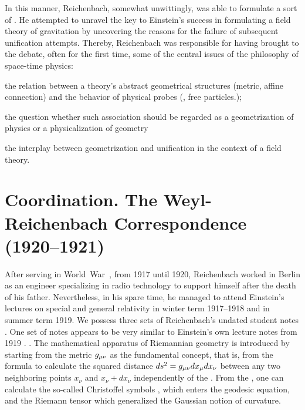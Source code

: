 \documentclass[draft]{article}
\newcommand{\xdx}{\ensuremath{x_\nu} and \ensuremath{x_\nu + dx_\nu}\xspace}
\begin{document}

In this manner, Reichenbach, somewhat unwittingly, was able to formulate a sort of  \citep{Lehmkuhl2017}. He attempted to unravel the key to Einstein's success in formulating a field theory of gravitation by uncovering the reasons for the failure of subsequent unification attempts. Thereby, Reichenbach was responsible for having brought to the debate, often for the first time, some of the central issues of the philosophy of space-time physics: \begin{inparaenum}[(a)] \item the relation between a theory's abstract geometrical structures (metric, affine connection) and the behavior of physical probes (\rac, free particles\etc.); \item the question whether such association should be regarded as a geometrization of physics or a physicalization of geometry \item the interplay between geometrization and unification in the context of a field theory. \end{inparaenum} 

\section{Coordination. The Weyl-Reichenbach Correspondence (1920--1921)}
\label{Coordination}

After serving in World~War~, from 1917 until 1920, Reichenbach worked in Berlin as an engineer specializing in radio technology to support himself after the death of his father. Nevertheless, in his spare time, he managed to attend Einstein's lectures on special and general relativity in winter term 1917--1918 and in summer term 1919. We possess three sets of Reichenbach's undated student notes \citep[028-01-04, 028-01-03, 028-01-01]{HR}. One set of notes \citep[028-01-01]{HR} appears to be very similar to Einstein's own lecture notes from 1919 \citep{Einstein1919c}. . The mathematical apparatus of Riemannian geometry is introduced by starting from the metric $g_{\mu\nu}$ as the fundamental concept, that is, from the formula to calculate the squared distance $ds^2=g_{\mu\nu} dx_\mu dx_\nu$ between any two neighboring points \xdx independently of the \cs. From the \gmn, one can calculate the so-called Christoffel symbols \christoffel{\mu}{\nu}{\tau}, which enters the geodesic equation, and the Riemann tensor \rite which generalized the Gaussian notion of curvature. 
\end{document}
